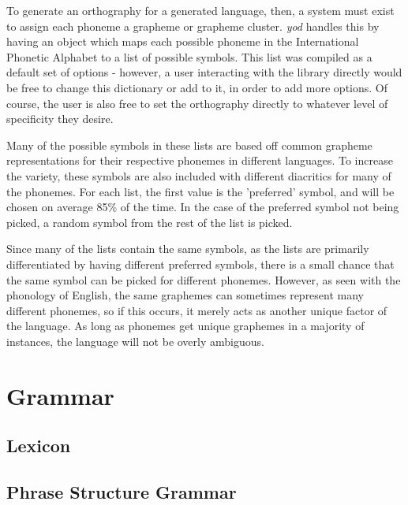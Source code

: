 \documentclass{report}
\begin{document}
	To generate an orthography for a generated language, then, a system must exist to assign each phoneme a grapheme or grapheme cluster. \textit{yod} handles this by having an object which maps each possible phoneme in the International Phonetic Alphabet to a list of possible symbols. This list was compiled as a default set of options - however, a user interacting with the library directly would be free to change this dictionary or add to it, in order to add more options. Of course, the user is also free to set the orthography directly to whatever level of specificity they desire.
	
	Many of the possible symbols in these lists are based off common grapheme representations for their respective phonemes in different languages. To increase the variety, these symbols are also included with different diacritics for many of the phonemes. For each list, the first value is the 'preferred' symbol, and will be chosen on average 85\% of the time. In the case of the preferred symbol not being picked, a random symbol from the rest of the list is picked.
	
	Since many of the lists contain the same symbols, as the lists are primarily differentiated by having different preferred symbols, there is a small chance that the same symbol can be picked for different phonemes. However, as seen with the phonology of English, the same graphemes can sometimes represent many different phonemes, so if this occurs, it merely acts as another unique factor of the language. As long as phonemes get unique graphemes in a majority of instances, the language will not be overly ambiguous.

	\chapter{Grammar}
	
	\section{Lexicon}
	
	\section{Phrase Structure Grammar}
   
   \printbibliography
\end{document}
